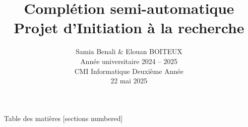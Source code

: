 \documentclass[10pt]{beamer}
\title{\vspace{1cm}Complétion semi-automatique\\Projet d'Initiation à la recherche}
\author{Samia Benali \& Elouan BOITEUX\\[0.3cm]Année universitaire 2024 -- 2025 \\[0.3cm]CMI Informatique Deuxième Année\\[0.3cm]22 mai 2025}
\date{}
\begin{document}
\maketitle

\begin{frame}{Table des matières}
	[sections numbered]
	\tableofcontents%
\end{frame}







\end{document}
